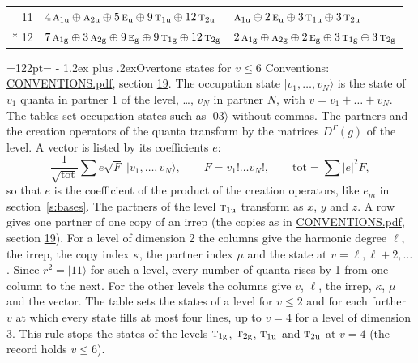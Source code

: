 \documentclass[10pt,a4paper]{article}
\makeatletter
\renewcommand\section{\@startsection{section}{1}{\z@}{-3ex plus -1ex minus -.2ex}%
  {1.2ex plus .2ex}{\normalfont\large\sffamily\bfseries\color{parttitle}}}
\newcommand{\needspace}[1]{\par\penalty-100\begingroup\dimen0=#1\relax\dimen2=\pagegoal
  \advance\dimen2-\pagetotal\ifdim\dimen0>\dimen2\relax\ifdim\dimen2>0pt\vfil\break\fi\fi
  \endgroup}
\numberwithin{equation}{section}
\newcommand{\irr}[1]{\text{\normalfont\scshape #1}}
\newcommand{\ptag}[1]{\mathrm{#1}}
\newcommand{\repD}[1]{D^{#1}}
\newcommand{\mult}{\kappa}
\newcommand{\intx}{\mu}
\newcommand{\occ}[1]{\lvert #1\rangle}
\makeatother
\begin{document}
{\begin{longtable}{@{}rll@{}}
11 & $4\,\irr{a}_{1\ptag{u}} \oplus \irr{a}_{2\ptag{u}} \oplus 5\,\irr{e}_{\ptag{u}} \oplus 9\,\irr{t}_{1\ptag{u}} \oplus 12\,\irr{t}_{2\ptag{u}}$ & $\irr{a}_{1\ptag{u}} \oplus 2\,\irr{e}_{\ptag{u}} \oplus 3\,\irr{t}_{1\ptag{u}} \oplus 3\,\irr{t}_{2\ptag{u}}$\\*
12 & $7\,\irr{a}_{1\ptag{g}} \oplus 3\,\irr{a}_{2\ptag{g}} \oplus 9\,\irr{e}_{\ptag{g}} \oplus 9\,\irr{t}_{1\ptag{g}} \oplus 12\,\irr{t}_{2\ptag{g}}$ & $2\,\irr{a}_{1\ptag{g}} \oplus \irr{a}_{2\ptag{g}} \oplus 2\,\irr{e}_{\ptag{g}} \oplus 3\,\irr{t}_{1\ptag{g}} \oplus 3\,\irr{t}_{2\ptag{g}}$\\
\bottomrule\end{longtable}}
\needspace{122pt}
\section{Overtone states for \texorpdfstring{$v \le 6$}{v \textleq\ 6}}\label{s:overtone_states}
Conventions: \href{../../CONVENTIONS.pdf}{CONVENTIONS.pdf}, section \href{../../CONVENTIONS.pdf\#conv.19}{19}.
\leavevmode\label{n:vector.occupation}\label{n:local.quanta.partner}\label{n:local.weight.occupation}The occupation state $\occ{v_1, \dots, v_N}$ is the state of $v_1$ quanta in partner 1 of the level, \dots, $v_N$ in partner $N$, with $v = v_1 + \dots + v_N$. The tables set occupation states such as $\occ{03}$ without commas. The partners and the creation operators of the quanta transform by the matrices $\repD{\Gamma}(g)$ of the level. A vector is listed by its coefficients $e$:
\begin{equation}\label{e:occupation}\frac{1}{\sqrt{\mathrm{tot}}}\sum e\sqrt{F}\;\occ{v_1, \dots, v_N},\qquad F = v_1!\dots v_N!,\qquad \mathrm{tot} = \sum |e|^2F,\end{equation}
so that $e$ is the coefficient of the product of the creation operators, like $e_m$ in section~\ref{s:bases}. The partners of the level $\irr{t}_{1\ptag{u}}$ transform as $x$, $y$ and $z$. A row gives one partner of one copy of an irrep (the copies as in \href{../../CONVENTIONS.pdf}{CONVENTIONS.pdf}, section \href{../../CONVENTIONS.pdf\#conv.19}{19}). For a level of dimension 2 the columns give the harmonic degree $\ell$, the irrep, the copy index $\mult$, the partner index $\intx$ and the state at $v = \ell, \ell + 2, \dots$. Since $r^2 = \occ{11}$ for such a level, every number of quanta rises by 1 from one column to the next. For the other levels the columns give $v$, $\ell$, the irrep, $\mult$, $\intx$ and the vector.
The table sets the states of a level for $v \le 2$ and for each further $v$ at which every state fills at most four lines, up to $v = 4$ for a level of dimension 3. This rule stops the states of the levels $\irr{t}_{1\ptag{g}}$, $\irr{t}_{2\ptag{g}}$, $\irr{t}_{1\ptag{u}}$ and $\irr{t}_{2\ptag{u}}$ at $v = 4$ (the record holds $v \le 6$).
\end{document}
